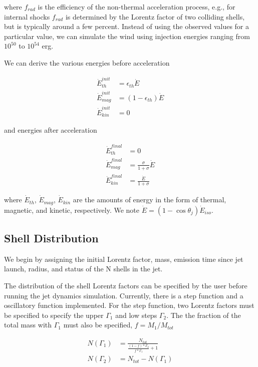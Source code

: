 \documentclass[linenumbers,twocolumn]{aastex631}
\begin{document}
where $f_{rad}$ is the efficiency of the non-thermal acceleration process, e.g., for internal shocks $f_{rad}$ is determined by the Lorentz factor of two colliding shells, but is typically around a few percent. Instead of using the observed values for a particular value, we can simulate the wind using injection energies ranging from $10^{50}$ to $10^{54}$ erg. 

We can derive the various energies before acceleration

\begin{align}
	\dot{E}^{init}_{th} &= \epsilon_{th}\dot{E} \\
	\dot{E}^{init}_{mag} &= (1-\epsilon_{th})\dot{E} \\
	\dot{E}^{init}_{kin} &= 0
\end{align}

and energies after acceleration

\begin{align}
	\dot{E}^{final}_{th} &= 0 \\ 
	\dot{E}^{final}_{mag} &= \frac{\sigma}{1+\sigma}\dot{E} \\
	\dot{E}^{final}_{kin} &= \frac{\dot{E}}{1+\sigma}
\end{align}

where $\dot{E}_{th}$, $\dot{E}_{mag}$, $\dot{E}_{kin}$ are the amounts of energy in the form of thermal, magnetic, and kinetic, respectively. We note $\dot{E} = (1-\cos\theta_j)\dot{E}_{iso}$.


\subsection{Shell Distribution}

We begin by assigning the initial Lorentz factor, mass, emission time since jet launch, radius, and status of the N shells in the jet. 

The distribution of the shell Lorentz factors can be specified by the user before running the jet dynamics simulation. Currently, there is a step function and a oscillatory function implemented. For the step function, two Lorentz factors must be specified to specify the upper $\Gamma_1$ and low steps $\Gamma_2$. The the fraction of the total mass with $\Gamma_1$ must also be specified, $f=M_1/M_{tot}$

\begin{align}
	N(\Gamma_1) &= \frac{N_{tot}}{\frac{(1-f)*\Gamma_2}{f*\Gamma_1} + 1} \\
	N(\Gamma_2) &= N_{tot} - N(\Gamma_1) \\ 
\end{align}
\end{document}
